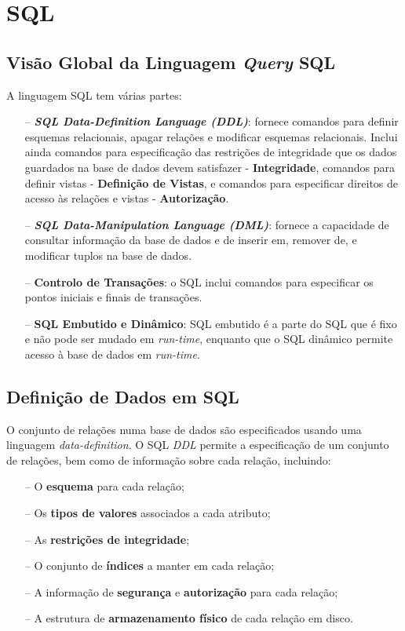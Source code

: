 \documentclass[oneside]{book}
\theoremstyle{definition}
\begin{document}
\chapter{SQL}

\section{Visão Global da Linguagem \textit{Query} SQL}
A linguagem SQL tem várias partes:
\begin{itemize}
    \itemsep0cm
    \item[--]\textbf{\textit{SQL Data-Definition Language (DDL)}}: fornece comandos para definir esquemas relacionais, apagar relações e modificar esquemas relacionais. Inclui ainda comandos para especificação das restrições de integridade que os dados guardados na base de dados devem satisfazer - \textbf{Integridade}, comandos para definir vistas - \textbf{Definição de Vistas}, e comandos para especificar direitos de acesso às relações e vistas - \textbf{Autorização}.
    \item[--]\textbf{\textit{SQL Data-Manipulation Language (DML)}}: fornece a capacidade de consultar informação da base de dados e de inserir em, remover de, e modificar tuplos na base de dados.
    \item[--]\textbf{Controlo de Transações}: o SQL inclui comandos para especificar os pontos iniciais e finais de transações.
    \item[--]\textbf{SQL Embutido e Dinâmico}: SQL embutido é a parte do SQL que é fixo e não pode ser mudado em \textit{run-time}, enquanto que o SQL dinâmico permite acesso à base de dados em \textit{run-time}.
\end{itemize}

\section{Definição de Dados em SQL}
O conjunto de relações numa base de dados são especificados usando uma linguagem \textit{data-definition}. 
O SQL \textit{DDL} permite a especificação de um conjunto de relações, bem como de informação sobre cada relação, incluindo:
\begin{itemize}
    \itemsep0cm
    \item[--]O \textbf{esquema} para cada relação;
    \item[--]Os \textbf{tipos de valores} associados a cada atributo;
    \item[--]As \textbf{restrições de integridade};
    \item[--]O conjunto de \textbf{índices} a manter em cada relação;
    \item[--]A informação de \textbf{segurança} e \textbf{autorização} para cada relação;
    \item[--]A estrutura de \textbf{armazenamento físico} de cada relação em disco.
\end{itemize}
\end{document}
